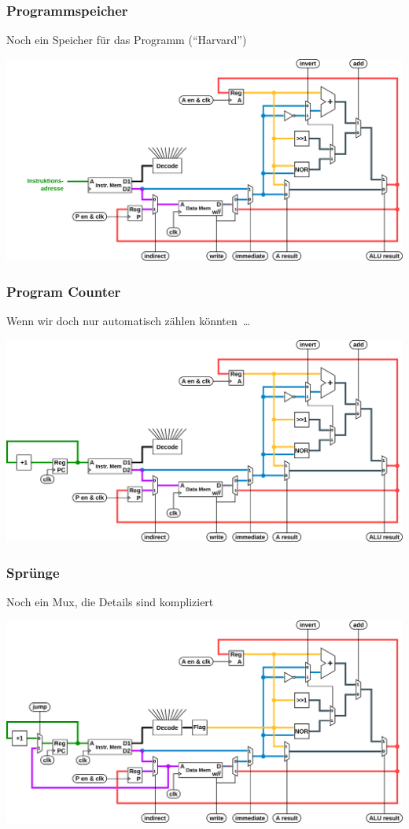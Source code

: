 \documentclass[t,aspectratio=169,usenames,dvipsnames]{beamer}
\begin{document}
\begin{frame}
  \frametitle{Programmspeicher}

  \strut{}Noch ein Speicher für das Programm (\enquote{Harvard})

  \begin{center}
    \includegraphics[width=.85\textwidth]{sch-progmem.pdf}
  \end{center}
\end{frame}

\begin{frame}
  \frametitle{Program Counter}

  \strut{}Wenn wir doch nur automatisch zählen könnten~\ldots

  \begin{center}
    \includegraphics[width=.85\textwidth]{sch-pc.pdf}
  \end{center}
\end{frame}

\begin{frame}
  \frametitle{Sprünge}

  \strut{}Noch ein Mux, die Details sind kompliziert

  \begin{center}
    \includegraphics[width=.85\textwidth]{schematic.pdf}
  \end{center}
\end{frame}
\end{document}
